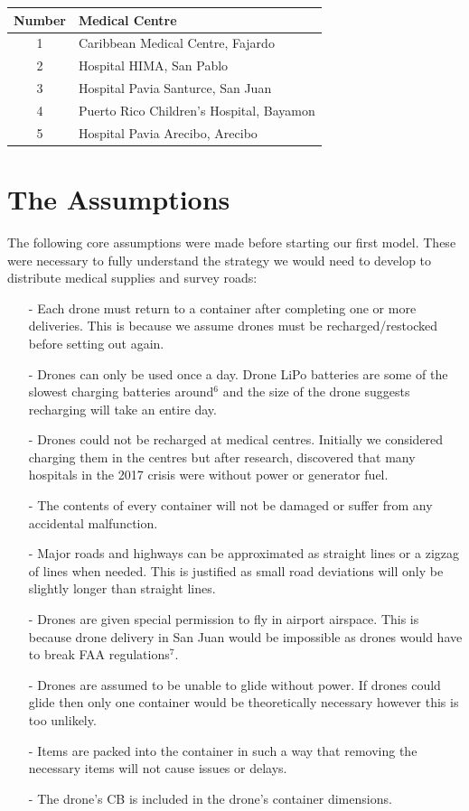 \documentclass[a4paper,12pt]{article}
\begin{document}
\begin{center}
\begin{tabular}{ |c|l| }
 \hline
 Number & Medical Centre  \\\hline
 1 & Caribbean Medical Centre, Fajardo \\
 2 & Hospital HIMA, San Pablo \\
 3 & Hospital Pavia Santurce, San Juan \\
 4 & Puerto Rico Children's Hospital, Bayamon \\
 5 & Hospital Pavia Arecibo, Arecibo  \\
 \hline
\end{tabular}
\end{center}

\section{The Assumptions}
The following core assumptions were made before starting our first model. These were necessary to fully understand the strategy we would
need to develop to distribute medical supplies and survey roads:

\begin{itemize}
\item[-]Each drone must return to a container after completing one or more deliveries.
        This is because we assume drones must be recharged/restocked before setting out again.
\item[-]Drones can only be used once a day. Drone LiPo batteries are some of the slowest charging batteries around$^{6}$ and
        the size of the drone suggests recharging will take an entire day.
\item[-]Drones could not be recharged at medical centres.
        Initially we considered charging them in the centres but after research, discovered that
        many hospitals in the 2017 crisis were without power or generator fuel.
\item[-]The contents of every container will not be damaged or suffer from any accidental malfunction.
\item[-]Major roads and highways can be approximated as straight lines or a zigzag of lines when needed. This is justified as small road deviations will only be slightly longer than straight lines.
\item[-]Drones are given special permission to fly in airport airspace. This is because drone delivery in San Juan would be impossible as drones would have to break FAA regulations$^7$.
\item[-]Drones are assumed to be unable to glide without power. If drones could glide then only one container would be theoretically necessary however this is too unlikely.
\item[-]Items are packed into the container in such a way that removing the necessary items will not cause issues or delays.
\item[-]The drone's CB is included in the drone's container dimensions.
\end{itemize}
\end{document}

